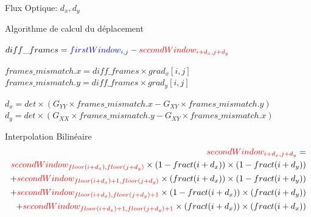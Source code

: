 \documentclass{bredelebeamer}
\begin{document}
\begin{frame}{Flux Optique: $d_{x}, d_{y}$}

	\begin{block}{Algorithme de calcul du déplacement}
\begin{algorithmic}

	\State $diff\_frames = \textcolor{blue}{firstWindow_{i,j}} - \textcolor{red}{secondWindow_{i+d_{x},j+d_{y}}}$

	\State $frames\_mismatch.x = diff\_frames\times grad_{x}[i,j]$
	\State $frames\_mismatch.y = diff\_frames\times grad_{y}[i,j]$

	\EndFor

	\State $d_{x} = det\times (G_{YY}\times frames\_mismatch.x - G_{XY}\times frames\_mismatch.y)$
	\State $d_{y} = det\times (G_{XX}\times frames\_mismatch.y - G_{XY}\times frames\_mismatch.x)$
\end{algorithmic}
\end{block}

	\begin{alertblock}{Interpolation Bilinéaire}
\begin{equation*}
	\begin{split}
		\textcolor{red}{secondWindow_{i+d_{x},j+d_{y}}} =\\
		\textcolor{red}{secondWindow_{floor(i+d_{x}),floor(j+d_{y})}}\times (1-fract(i+d_{x}))\times (1-fract(i+d_{y}))\\
		+ \textcolor{red}{secondWindow_{floor(i+d_{x})+1,floor(j+d_{y})}}\times (fract(i+d_{x}))\times (1-fract(i+d_{y}))\\
		+ \textcolor{red}{secondWindow_{floor(i+d_{x}),floor(j+d_{y})+1}}\times (1-fract(i+d_{x}))\times (fract(i+d_{y}))\\
		+ \textcolor{red}{secondWindow_{floor(i+d_{x})+1,floor(j+d_{y})+1}}\times (fract(i+d_{x}))\times (fract(i+d_{x}))
	\end{split}
\end{equation*}
	\end{alertblock}

\end{frame}

\end{document}
